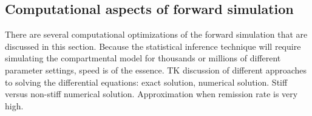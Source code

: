 \subsection{Computational aspects of forward simulation}
There are several computational optimizations of the forward simulation that are discussed in this section.  Because the statistical inference technique will require simulating the compartmental model for thousands or millions of different parameter settings, speed is of the essence.
TK discussion of different approaches to solving the differential equations: exact solution, numerical solution. Stiff versus non-stiff numerical solution. Approximation when remission rate is very high.
